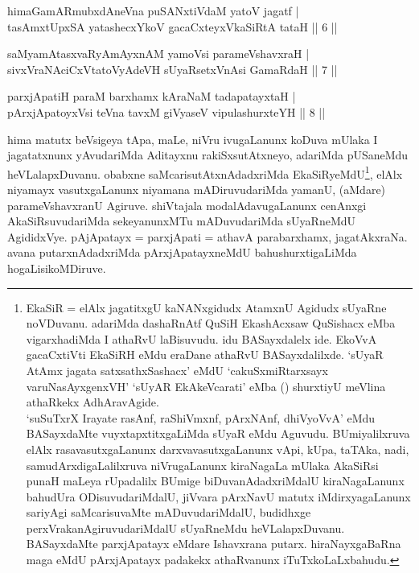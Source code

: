 \begin{shl}
himaGamARmubxdAneVna puSANxtiVdaM yatoV jagatf | \\
tasAmxtUpxSA yatashecxYkoV gacaCxteyxVkaSiRtA tataH \hfill||  6 || 
\end{shl}

\begin{shl}
saMyamAtasxvaRyAmAyxnAM yamoV\s si parameVshavxraH | \\
sivxVraNAciCxVtatoVyAdeVH sUyaRsetxVnAsi GamaRdaH \hfill||  7 ||
\end{shl}

\begin{shl}
parxjApatiH paraM barxhamx kAraNaM tadapatayxtaH | \\
pArxjApatoyxV\s si teVna tavxM giVyaseV vipulashurxteYH \hfill||  8 || 
\end{shl}

\begin{artha} 
hima matutx beVsigeya tApa, maLe, niVru ivugaLanunx koDuva mUlaka I 
jagatatxnunx yAvudariMda Aditayxnu rakiSxsutAtxneyo, adariMda 
pUSaneMdu heVLalapxDuvanu. obabxne saMcarisutAtxnAdadxriMda 
EkaSiRyeMdU\footnote[2]{EkaSiR = elAlx jagatitxgU kaNANxgidudx AtamxnU 
Agidudx sUyaRne noVDuvanu. adariMda dashaRnAtf QuSiH EkashAcxsaw 
QuSishacx eMba vigarxhadiMda I athaRvU laBisuvudu. idu BASayxdalelx 
ide. EkoVvA gacaCxtiVti EkaSiRH eMdu eraDane athaRvU BASayxdalilxde. 
`sUyaR AtAmx jagata satxsathxSashacx' eMdU `cakuSxmiRtarxsayx 
varuNasAyxgenxVH' `sUyAR EkAkeVcarati' eMba () shurxtiyU meVlina 
athaRkekx AdhAravAgide.\\ 
`suSuTxrX Irayate rasAnf, raShiVmxnf, pArxNAnf, dhiVyoVvA' eMdu BASayxdaMte vuyxtapxtitxgaLiMda sUyaR eMdu Aguvudu. 
BUmiyalilxruva elAlx rasavasutxgaLanunx darxvavasutxgaLanunx vApi, 
kUpa, taTAka, nadi, samudArxdigaLalilxruva niVrugaLanunx kiraNagaLa 
mUlaka AkaSiRsi punaH maLeya rUpadalilx BUmige biDuvanAdadxriMdalU 
kiraNagaLanunx bahudUra ODisuvudariMdalU, jiVvara pArxNavU matutx 
iMdirxyagaLanunx sariyAgi saMcarisuvaMte mADuvudariMdalU, budidhxge 
perxVrakanAgiruvudariMdalU sUyaRneMdu heVLalapxDuvanu. BASayxdaMte 
parxjApatayx eMdare Ishavxrana putarx. hiraNayxgaBaRna maga eMdU 
pArxjApatayx padakekx athaRvanunx iTuTxkoLaLxbahudu.}, 
elAlx niyamayx vasutxgaLanunx niyamana 
mADiruvudariMda yamanU, (aMdare) parameVshavxranU Agiruve. shiVtajala 
modalAdavugaLanunx cenAnxgi AkaSiRsuvudariMda sekeyanunxMTu 
mADuvudariMda sUyaRneMdU AgididxVye. pAjApatayx = parxjApati = athavA 
parabarxhamx, jagatAkxraNa. avana putarxnAdadxriMda pArxjApatayxneMdU 
bahushurxtigaLiMda hogaLisikoMDiruve.
\end{artha}

